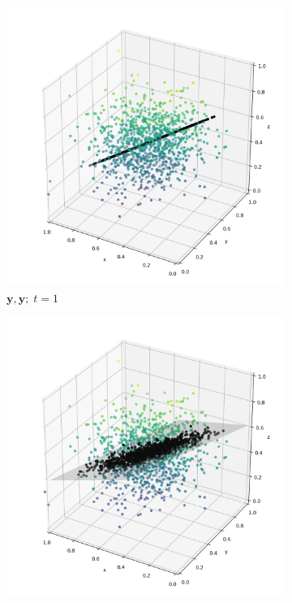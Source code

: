 \documentclass[]{article}
\newcommand{\yy}{\mathbf{y}}
\begin{document}
\begin{figure}[H]
	\medskip
	\begin{subfigure}{0.3\textwidth}
		\includegraphics[width=\linewidth]{resources/Y_Y_1_simulated.png}
		\caption{$\yy, \yy; \; t=1$}
		\label{fig:4}
	\end{subfigure}\hfil
	\begin{subfigure}{0.3\textwidth}
		\includegraphics[width=\linewidth]{resources/Y_Y_2_simulated.png}

\end{subfigure}
\end{figure}
\end{document}
